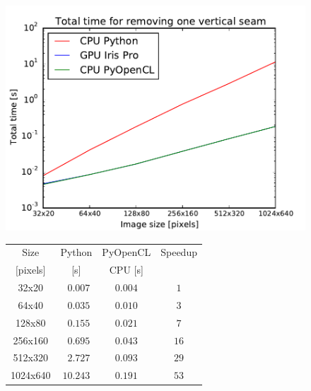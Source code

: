 \documentclass[a4paper,11pt]{article}
\begin{document}
\begin{figure}[h!]
\begin{minipage}[b]{0.49\textwidth}
	\centering
	\includegraphics[width=\textwidth]{../results/total-time.pdf}
	\label{fig:times}
\end{minipage}
\hfill
\begin{minipage}[b]{0.47\textwidth}
	\centering
	\begin{footnotesize}
	\begin{tabular}{cccc}
	\hline	
	Size     			& Python 				& PyOpenCL 	& Speedup 	\\
	$[$pixels$]$		&	[s]					&	CPU [s]				&					\\ \hline
	32x20    		& $\;\ 0.007$		& $0.004$     	& $1$      	\\
	64x40    		& $\;\ 0.035$		& $0.010$      & $3$      	\\
	128x80   		& $\;\ 0.155$		& $0.021$      & $7$      	\\
	256x160  	& $\;\ 0.695$		& $0.043$      & $16$      	\\
	512x320  	& $\;\ 2.727$		& $0.093$      & $29$      	\\
	1024x640 	& $10.243$		& $0.191$      & $53$      	\\ \hline
	\end{tabular}
	\end{footnotesize}
	\label{tab:times}
\end{minipage}
\end{figure}
\end{document}
